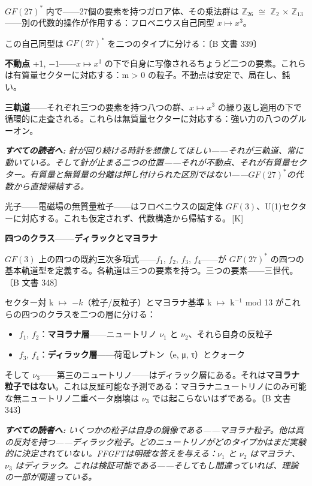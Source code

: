 \documentclass[11pt,openany]{book}
\newcommand{\status}[1]{\penalty10000\,{\tiny\textcolor{gray!70}{[#1]}}}
\newenvironment{laierspur}{%
  \par\vspace{4pt}%
  \noindent\small\itshape\color{blue!60!black}%
  \textbf{すべての読者へ:}\enspace\ignorespaces}{%
  \par\vspace{4pt}\normalsize\normalfont\normalcolor}
\begin{document}
$GF(27)^*$ 内で——27個の要素を持つガロア体、その乗法群は $\mathbb{Z}_{26}$ $\cong$ $\mathbb{Z}_2$ $\times$ $\mathbb{Z}_{13}$——別の代数的操作が作用する：フロベニウス自己同型 $x \mapsto x^3$。

この自己同型は $GF(27)^*$ を二つのタイプに分ける：〔B 文書 339〕

\textbf{不動点} {+1, $-1$}——$x \mapsto x^3$ の下で自身に写像されるちょうど二つの要素。これらは有質量セクターに対応する：m > 0 の粒子。不動点は安定で、局在し、鈍い。

\textbf{三軌道}——それぞれ三つの要素を持つ八つの群、$x \mapsto x^3$ の繰り返し適用の下で循環的に走査される。これらは無質量セクターに対応する：強い力の八つのグルーオン。

\begin{laierspur}
針が回り続ける時計を想像してほしい——それが三軌道、常に動いている。そして針が止まる二つの位置——それが不動点、それが有質量セクター。有質量と無質量の分離は押し付けられた区別ではない——$GF(27)^*$の代数から直接帰結する。
\end{laierspur}

光子——電磁場の無質量粒子——はフロベニウスの固定体 $GF(3)$、U(1)セクターに対応する。これも仮定されず、代数構造から帰結する。\status{K}

\textbf{四つのクラス——ディラックとマヨラナ}

$GF(3)$ 上の四つの既約三次多項式——$f_1$, $f_2$, $f_3$, $f_4$——が $GF(27)^*$ の四つの基本軌道型を定義する。各軌道は三つの要素を持つ。三つの要素——三世代。〔B 文書 348〕

セクター対 k $\mapsto$ $-k$（粒子/反粒子）とマヨラナ基準 k $\mapsto$ k$^{-1}$ mod 13 がこれらの四つのクラスを二つの層に分ける：

\begin{itemize}
\item $f_1$, $f_2$：\textbf{マヨラナ層}——ニュートリノ $\nu_1$ と $\nu_2$、それら自身の反粒子
\item $f_3$, $f_4$：\textbf{ディラック層}——荷電レプトン（e, μ, τ）とクォーク
\end{itemize}

そして $\nu_3$——第三のニュートリノ——はディラック層にある。それは\textbf{マヨラナ粒子ではない}。これは反証可能な予測である：マヨラナニュートリノにのみ可能な無ニュートリノ二重ベータ崩壊は $\nu_3$ では起こらないはずである。〔B 文書 343〕

\begin{laierspur}
いくつかの粒子は自身の鏡像である——マヨラナ粒子。他は真の反対を持つ——ディラック粒子。どのニュートリノがどのタイプかはまだ実験的に決定されていない。FFGFTは明確な答えを与える：$\nu_1$ と $\nu_2$ はマヨラナ、$\nu_3$ はディラック。これは検証可能である——そしてもし間違っていれば、理論の一部が間違っている。
\end{laierspur}
\end{document}
